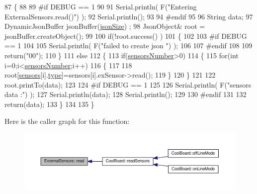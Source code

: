 \begin{DoxyCode}
87 \{
88 
89 \textcolor{preprocessor}{#if DEBUG == 1}
90 
91     Serial.println( F(\textcolor{stringliteral}{"Entering ExternalSensors.read()"}) );
92     Serial.println();
93 
94 \textcolor{preprocessor}{#endif }
95 
96     String data;
97     DynamicJsonBuffer  jsonBuffer(\hyperlink{classExternalSensors_acacea86d74d967b57fcff282d26cff57}{jsonSize}) ;
98     JsonObject& root = jsonBuffer.createObject();
99 
100     \textcolor{keywordflow}{if}(!root.success() )
101     \{
102  
103 \textcolor{preprocessor}{    #if DEBUG == 1}
104 
105         Serial.println( F(\textcolor{stringliteral}{"failed to create json "}) );
106     
107 \textcolor{preprocessor}{    #endif }
108 
109         \textcolor{keywordflow}{return}(\textcolor{stringliteral}{"00"});
110     \}
111     \textcolor{keywordflow}{else}
112     \{
113         \textcolor{keywordflow}{if}(\hyperlink{classExternalSensors_a58e4fbf9adeae787d92be5fa33043b5d}{sensorsNumber}>0)
114         \{
115             \textcolor{keywordflow}{for}(\textcolor{keywordtype}{int} i=0;i<\hyperlink{classExternalSensors_a58e4fbf9adeae787d92be5fa33043b5d}{sensorsNumber};i++)
116             \{
117             
118                 root[\hyperlink{classExternalSensors_a284233f884fcf00154a44740cf1d9e1e}{sensors}[i].\hyperlink{structExternalSensors_1_1sensor_a6acfdb02c742c2110d7bd2b5d9fce9e7}{type}]=sensors[i].exSensor->read();       
119             \}
120         \}   
121         
122         root.printTo(data);
123     
124 \textcolor{preprocessor}{    #if DEBUG == 1}
125 
126         Serial.println( F(\textcolor{stringliteral}{"sensors data :"}) );
127         Serial.println(data);
128         Serial.println();
129     
130 \textcolor{preprocessor}{    #endif}
131     
132         \textcolor{keywordflow}{return}(data);
133     \}
134 
135 \}
\end{DoxyCode}
Here is the caller graph for this function\+:\nopagebreak
\begin{figure}[H]
\begin{center}
\leavevmode
\includegraphics[width=350pt]{classExternalSensors_a53177b81eca3be89508b5511ddcd00fc_icgraph}
\end{center}
\end{figure}


